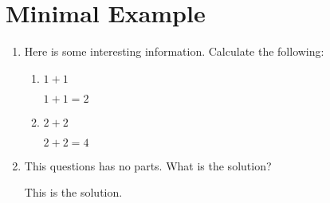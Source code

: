 \documentclass[12pt]{article}
\begin{document}
\section*{Minimal Example}

\begin{enumerate}

\item Here is some interesting information. Calculate the following:

\begin{enumerate}
\item $1+1$

\begin{solution}
$1+1 = 2$
\end{solution}


\item $2+2$

\begin{solution}
$2+2=4$
\end{solution}

\end{enumerate}

\item This questions has no parts. What is the solution?

\begin{solution}
This is the solution.
\end{solution}

\end{enumerate}
\end{document}
